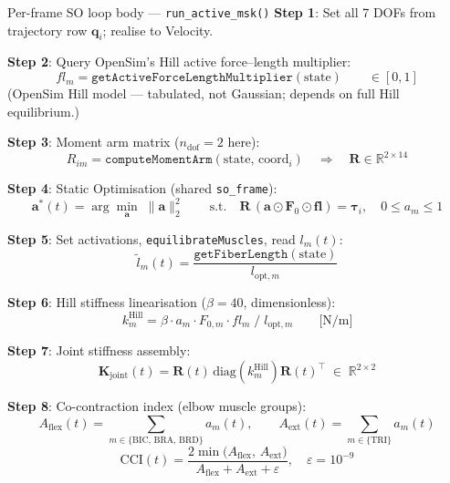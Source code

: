 \documentclass[11pt,a4paper]{article}
\newcommand{\R}{\mathbb{R}}
\newcommand{\bR}{\bm{R}}
\newcommand{\ba}{\bm{a}}
\newcommand{\bF}{\bm{F}}
\newcommand{\btau}{\bm{\tau}}
\newcommand{\bq}{\bm{q}}
\newcommand{\bK}{\bm{K}}
\begin{document}
\begin{eqbox}{Per-frame SO loop body — \texttt{run\_active\_msk()}}
\textbf{Step 1}: Set all 7 DOFs from trajectory row $\bq_i$; realise to Velocity.

\textbf{Step 2}: Query OpenSim's Hill active force--length multiplier:
\begin{equation}
fl_m = \texttt{getActiveForceLengthMultiplier}(\text{state})
\qquad\in [0,1]
\end{equation}
(OpenSim Hill model — tabulated, not Gaussian; depends on full Hill equilibrium.)

\textbf{Step 3}: Moment arm matrix ($n_\text{dof}=2$ here):
\begin{equation}
R_{im} = \texttt{computeMomentArm}(\text{state},\,\text{coord}_i)
\quad\Rightarrow\quad
\bR \in \R^{2\times14}
\end{equation}

\textbf{Step 4}: Static Optimisation (shared \texttt{so\_frame}):
\begin{equation}
\ba^*(t) = \arg\min_{\ba}\;\|\ba\|_2^2 \qquad
\text{s.t.}\quad \bR\,(\ba\odot\bF_0\odot\bm{fl}) = \btau_i,
\quad 0 \leq a_m \leq 1
\end{equation}

\textbf{Step 5}: Set activations, \texttt{equilibrateMuscles}, read $l_m(t)$:
\begin{equation}
\tilde{l}_m(t) = \frac{\texttt{getFiberLength}(\text{state})}{l_{\text{opt},m}}
\end{equation}

\textbf{Step 6}: Hill stiffness linearisation ($\beta = 40$, dimensionless):
\begin{equation}
k_m^{\text{Hill}} = \beta \cdot a_m \cdot F_{0,m} \cdot fl_m \;/\; l_{\text{opt},m}
\qquad\bigl[\text{N/m}\bigr]
\end{equation}

\textbf{Step 7}: Joint stiffness assembly:
\begin{equation}
\bK_\text{joint}(t) = \bR(t)\,\mathrm{diag}\!\left(k_m^{\text{Hill}}\right)\bR(t)^\top
  \;\in\; \R^{2\times2}
\end{equation}

\textbf{Step 8}: Co-contraction index (elbow muscle groups):
\begin{equation}
A_\text{flex}(t) = \sum_{m\in\{\text{BIC, BRA, BRD}\}} a_m(t),
\qquad
A_\text{ext}(t)  = \sum_{m\in\{\text{TRI}\}} a_m(t)
\end{equation}
\begin{equation}
\text{CCI}(t) = \frac{2\min\bigl(A_\text{flex},\,A_\text{ext}\bigr)}
                     {A_\text{flex} + A_\text{ext} + \varepsilon},
\quad \varepsilon = 10^{-9}
\end{equation}
\end{eqbox}
\end{document}
